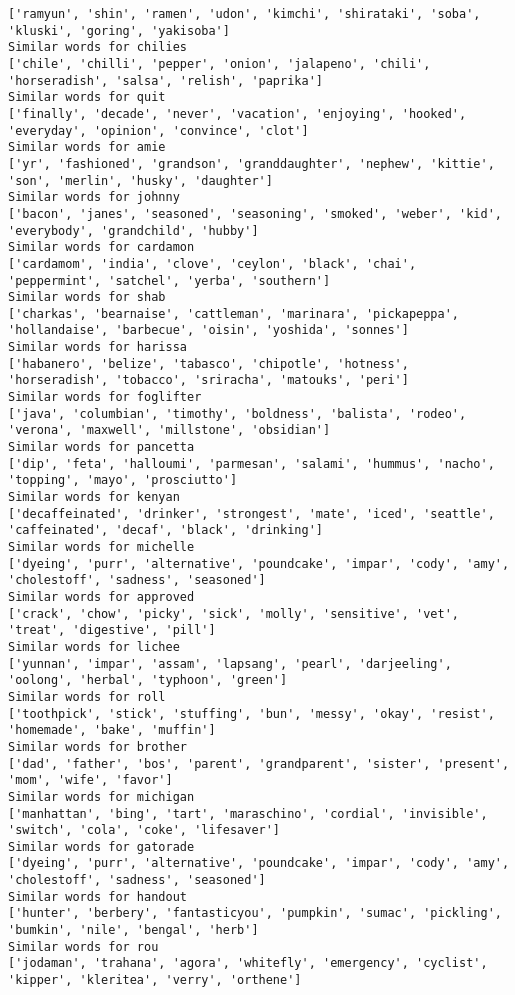 \documentclass[11pt]{article}
\begin{document}
\begin{Verbatim}[commandchars=\\\{\}]
['ramyun', 'shin', 'ramen', 'udon', 'kimchi', 'shirataki', 'soba', 'kluski', 'goring', 'yakisoba']
Similar words for chilies
['chile', 'chilli', 'pepper', 'onion', 'jalapeno', 'chili', 'horseradish', 'salsa', 'relish', 'paprika']
Similar words for quit
['finally', 'decade', 'never', 'vacation', 'enjoying', 'hooked', 'everyday', 'opinion', 'convince', 'clot']
Similar words for amie
['yr', 'fashioned', 'grandson', 'granddaughter', 'nephew', 'kittie', 'son', 'merlin', 'husky', 'daughter']
Similar words for johnny
['bacon', 'janes', 'seasoned', 'seasoning', 'smoked', 'weber', 'kid', 'everybody', 'grandchild', 'hubby']
Similar words for cardamon
['cardamom', 'india', 'clove', 'ceylon', 'black', 'chai', 'peppermint', 'satchel', 'yerba', 'southern']
Similar words for shab
['charkas', 'bearnaise', 'cattleman', 'marinara', 'pickapeppa', 'hollandaise', 'barbecue', 'oisin', 'yoshida', 'sonnes']
Similar words for harissa
['habanero', 'belize', 'tabasco', 'chipotle', 'hotness', 'horseradish', 'tobacco', 'sriracha', 'matouks', 'peri']
Similar words for foglifter
['java', 'columbian', 'timothy', 'boldness', 'balista', 'rodeo', 'verona', 'maxwell', 'millstone', 'obsidian']
Similar words for pancetta
['dip', 'feta', 'halloumi', 'parmesan', 'salami', 'hummus', 'nacho', 'topping', 'mayo', 'prosciutto']
Similar words for kenyan
['decaffeinated', 'drinker', 'strongest', 'mate', 'iced', 'seattle', 'caffeinated', 'decaf', 'black', 'drinking']
Similar words for michelle
['dyeing', 'purr', 'alternative', 'poundcake', 'impar', 'cody', 'amy', 'cholestoff', 'sadness', 'seasoned']
Similar words for approved
['crack', 'chow', 'picky', 'sick', 'molly', 'sensitive', 'vet', 'treat', 'digestive', 'pill']
Similar words for lichee
['yunnan', 'impar', 'assam', 'lapsang', 'pearl', 'darjeeling', 'oolong', 'herbal', 'typhoon', 'green']
Similar words for roll
['toothpick', 'stick', 'stuffing', 'bun', 'messy', 'okay', 'resist', 'homemade', 'bake', 'muffin']
Similar words for brother
['dad', 'father', 'bos', 'parent', 'grandparent', 'sister', 'present', 'mom', 'wife', 'favor']
Similar words for michigan
['manhattan', 'bing', 'tart', 'maraschino', 'cordial', 'invisible', 'switch', 'cola', 'coke', 'lifesaver']
Similar words for gatorade
['dyeing', 'purr', 'alternative', 'poundcake', 'impar', 'cody', 'amy', 'cholestoff', 'sadness', 'seasoned']
Similar words for handout
['hunter', 'berbery', 'fantasticyou', 'pumpkin', 'sumac', 'pickling', 'bumkin', 'nile', 'bengal', 'herb']
Similar words for rou
['jodaman', 'trahana', 'agora', 'whitefly', 'emergency', 'cyclist', 'kipper', 'kleritea', 'verry', 'orthene']

\end{Verbatim}
\end{document}
